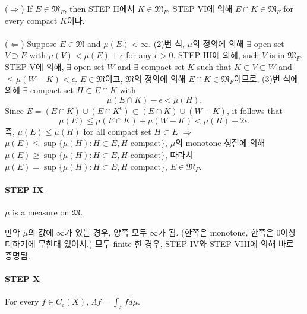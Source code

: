 \documentclass[11pt,reqno]{amsart}
\renewcommand{\(}{\left(}
\renewcommand{\)}{\right)}
\renewcommand{\[}{\left[}
\renewcommand{\]}{\right]}
\newcommand{\ep}{\epsilon}
\newcommand{\subheading}[1]{\vspace{1em}{\noindent\large\bfseries \textlangle{} #1 \textrangle{} \par}\vspace{1em}}
\newcommand{\M}{\mathfrak{M}}
\begin{document}
($\Rightarrow$) If $E \in \M_F$, then STEP II에서 $K \in \M_F$, STEP VI에 의해 $E \cap K \in \M_F$ for every compact 
$K$이다. \\ \\
($\Leftarrow$) Suppose $E \in \M$ and $\mu(E) < \infty$. (2)번 식, $\mu$의 정의에 의해  $\exists$ open set 
$V \supset E$ with $\mu(V) < \mu(E) + \ep$ for any $\ep > 0$. STEP III에 의해, such $V$ is in $\M_F$. STEP V에 의해,
$\exists$ open set $W$ and $\exists$ compact set $K$ such that $K \subset V \subset W$ and $\le \mu(W - K) < \ep$. 
$E \in \M$이고, $\M$의 정의에 의해 $E \cap K \in \M_F$이므로, (3)번 식에 의해
$\exists$ compact set $H \subset E \cap K$ with 
\begin{equation*}
  \mu (E \cap K) - \ep < \mu(H).
\end{equation*}
Since $E = (E \cap K) \cup (E \cap K^c) \subset (E \cap K) \cup (W - K)$, it follows that
\begin{equation*}
  \mu (E) \le \mu (E \cap K) + \mu(W - K) < \mu (H) + 2 \ep.
\end{equation*}
즉, $\mu (E) \le \mu (H)$ for all compact set $H \subset E$ $\Rightarrow$ $\mu (E) \le \sup \{ \mu(H) : H \subset E, 
H \text{ compact} \}$, $\mu$의 monotone 성질에 의해 $\mu (E) \ge \sup \{ \mu(H) : H \subset E, H \text{ compact} \}$,
따라서 $\mu (E) = \sup \{ \mu(H) : H \subset E, H \text{ compact} \}$, $E \in \M_F$.

\paragraph{STEP IX}

$\mu$ is a measure on $\M$.

\subheading{proof}

만약 $\mu$의 값에 $\infty$가 있는 경우, 양쪽 모두 $\infty$가 됨. (한쪽은 monotone, 한쪽은 0이상 더하기에 무한대 있어서.)
모두 finite 한 경우, STEP IV와 STEP VIII에 의해 바로 증명됨.

\paragraph{STEP X}

For every $f \in C_c(X)$, $\Lambda f = \int_x f d\mu$.

\subheading{proof}
\end{document}
